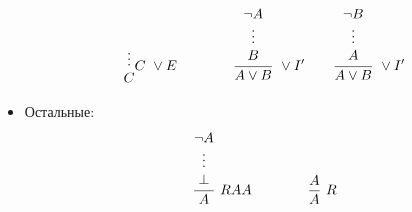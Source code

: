 \documentclass[10pt]{beamer}
\begin{document}
\begin{frame}
\begin{itemize}
\[{\begin{matrix}
            \rvdots \\
            C
        \end{matrix}
        }{C}\ \lor E
        \qquad \qquad         
        \frac{\begin{matrix}
            \neg A \\
            \rvdots \\
            B
\end{matrix}}{A \lor B}\ \lor I'
        \qquad 
\frac{\begin{matrix}
        \neg B \\
        \rvdots \\
        A
\end{matrix}}{A \lor B}\ \lor I'
        \]
        \item Остальные:
        \[
        \frac{\begin{matrix}
                \neg A \\
                \rvdots \\
                \bot
        \end{matrix}}{A}\ RAA
        \qquad \qquad 
        \frac{A}{A}\ R
        \]
    \end{itemize}
\end{frame}
\end{document}
